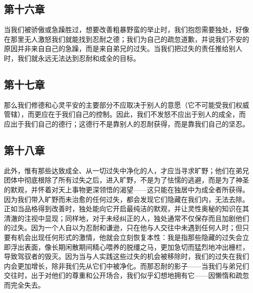 
\subsection{第十六章}

\par

当我们被骄傲或急躁胜过，想要改善粗暴野蛮的举止时，我们抱怨需要独处，好像在那里无人激怒我们就能找到忍耐之德；我们为自己的疏忽道歉，并说我们不安的原因并非来自自己的急躁，而是来自弟兄的过失。当我们把过失的责任推给别人时，我们就永远无法达到忍耐和成全的目标。\par


\subsection{第十七章}

\par

那么我们修德和心灵平安的主要部分不应取决于别人的意愿（它不可能受我们权威管辖），而更应在于我们自己的控制。因此，我们不发怒不应出于别人的成全，而应出于我们自己的德行；这德行不是靠别人的忍耐获得，而是靠我们自己的坚忍。\par


\subsection{第十八章}

\par

此外，惟有那些达致成全、从一切过失中净化的人，才应当寻求旷野；他们在弟兄团体中彻底根除了所有过失之后，进入旷野，不是为了怯懦的逃避，而是为了神圣的默观，并怀着对天上事物更深领悟的渴望——这只能在独居中为成全者所获得。因为我们带入旷野而未治愈的任何过失，都会发现它们隐藏在我们内，无法去除。正如当品格得到改善时，独处能向它开启最纯洁的默观，并让灵性奥秘的知识在其清澈的注视中显现；同样地，对于未经纠正的人，独处通常不仅保存而且加剧他们的过失。因为一个人自以为忍耐和谦逊，只在他与人交往中未遇到任何人时；但只要有机会出现任何形式的激情，他就会立刻恢复本性：我是指那些隐藏的过失会立即浮出表面，像长期闲散期间精心喂养的脱缰之马，更加急切而猛烈地冲出栅栏，导致驾驭者的毁灭。因为当与人实践这些过失的机会被移除时，我们的过失在我们内会更加增长，除非我们先从它们中被净化。而那忍耐的影子——当我们与弟兄们交往时，出于对他们的尊重和公开场合，我们似乎幻想地拥有它——因懒惰和疏忽而完全失去。\par

